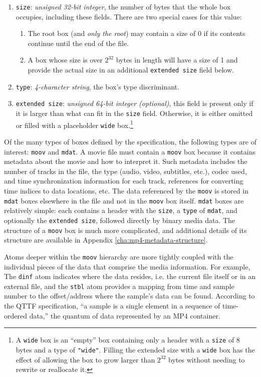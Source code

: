 \begin{enumerate}
	\item \texttt{size}: \emph{unsigned 32-bit integer}, the number of bytes that the whole box occupies, including these fields. There are two special cases for this value:
		\begin{enumerate}
			\item The root box (and \emph{only the root}) may contain a size of 0 if its contents continue until the end of the file.
			\item A box whose size is over \( 2^{32} \) bytes in length will have a size of 1 and provide the actual size in an additional \texttt{extended size} field below.
		\end{enumerate}
	\item \texttt{type}: \emph{4-character string}, the box's type discriminant.
	\item \texttt{extended size}: \emph{unsigned 64-bit integer (optional)}, this field is present only if it is larger than what can fit in the \texttt{size} field. Otherwise, it is either omitted or filled with a placeholder \texttt{wide} box.\footnote{A \texttt{wide} box is an ``empty'' box containing only a header with a \texttt{size} of 8 bytes and a type of \texttt{"wide"}. Filling the extended size with a \texttt{wide} box has the effect of allowing the box to grow larger than \( 2^{32} \) bytes without needing to rewrite or reallocate it.}
\end{enumerate}

Of the many types of boxes defined by the specification, the following types are of interest: \texttt{moov} and \texttt{mdat}. A movie file must contain a \texttt{moov} box because it contains metadata about the movie and how to interpret it. Such metadata includes the number of tracks in the file, the type (audio, video, subtitles, etc.), codec used, and time synchronization information for each track, references for converting time indices to data locations, etc. The data referenced by the \texttt{moov} is stored in \texttt{mdat} boxes elsewhere in the file and not in the \texttt{moov} box itself. \texttt{mdat} boxes are relatively simple: each contains a header with the \texttt{size}, a \texttt{type} of \texttt{mdat}, and optionally the \texttt{extended size}, followed directly by binary media data. The structure of a \texttt{moov} box is much more complicated, and additional details of its structure are available in Appendix \ref{cha:mp4-metadata-structure}.

Atoms deeper within the \texttt{moov} hierarchy are more tightly coupled with the individual pieces of the data that comprise the media information. For example, The \texttt{dinf} atom indicates where the data resides, i.e. the current file itself or in an external file, and the \texttt{stbl} atom provides a mapping from time and sample number to the offset/address where the sample's data can be found. According to the QTTF specification, ``a sample is a single element in a sequence of time-ordered data,'' the quantum of data represented by an MP4 container.

